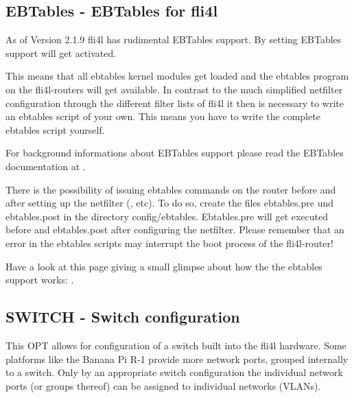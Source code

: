 {
\subsection {EBTables - EBTables for fli4l}
}
As of Version 2.1.9 fli4l has rudimental EBTables support.
By setting  EBTables support will get activated. 

This means that all ebtables kernel modules get loaded and the 
ebtables program on the fli4l-routers will get available.
In contrast to the much simplified netfilter configuration
through the different filter lists of fli4l it then is
necessary to write an ebtables script of your own. This
means you have to write the complete ebtables script yourself.

For background informations about EBTables support please read
the EBTables documentation at .

There is the possibility of issuing ebtables commands on the router 
before and after setting up the netfilter (,  etc).
To do so, create the files ebtables.pre und ebtables.post 
in the directory config/ebtables. Ebtables.pre  will get executed before 
and ebtables.post after configuring the netfilter. Please remember that
an error in the ebtables scripts may interrupt the boot process 
of the fli4l-router!


Have a look at this page giving a small glimpse about how the
the ebtables support works:
.

{
\subsection {SWITCH - Switch configuration}
}

This OPT allows for configuration of a switch built into the fli4l hardware.
Some platforms like the Banana Pi R-1 provide more network ports, grouped
internally to a switch. Only by an appropriate switch configuration the individual
network ports (or groups thereof) can be assigned to individual networks (VLANs).


